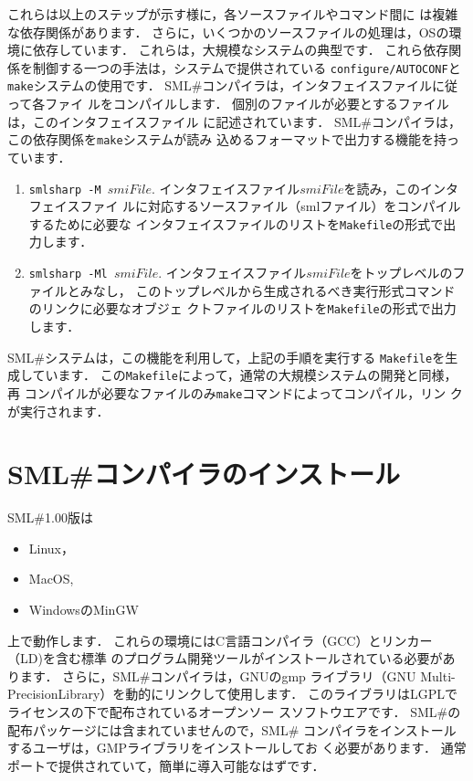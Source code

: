 \documentclass{jbook}
\newcommand{\smlsharp}{SML\#}
\newcommand{\version}{1.00}
\begin{document}
	これらは以上のステップが示す様に，各ソースファイルやコマンド間に
は複雑な依存関係があります．
	さらに，いくつかのソースファイルの処理は，OSの環境に依存しています．
	これらは，大規模なシステムの典型です．
	これら依存関係を制御する一つの手法は，システムで提供されている
{\tt configure/AUTOCONF}と{\tt make}システムの使用です．
	\smlsharp{}コンパイラは，インタフェイスファイルに従って各ファイ
ルをコンパイルします．
	個別のファイルが必要とするファイルは，このインタフェイスファイル
に記述されています．
	\smlsharp{}コンパイラは，この依存関係を{\tt make}システムが読み
込めるフォーマットで出力する機能を持っています．
\begin{enumerate}
\item {\tt smlsharp -M $smiFile$}.
	インタフェイスファイル$smiFile$を読み，このインタフェイスファイ
ルに対応するソースファイル（smlファイル）をコンパイルするために必要な
インタフェイスファイルのリストを{\tt Makefile}の形式で出力します．
\item {\tt smlsharp -Ml $smiFile$}.
	インタフェイスファイル$smiFile$をトップレベルのファイルとみなし，
このトップレベルから生成されるべき実行形式コマンドのリンクに必要なオブジェ
クトファイルのリストを{\tt Makefile}の形式で出力します．
\end{enumerate}	
	\smlsharp{}システムは，この機能を利用して，上記の手順を実行する
{\tt Makefile}を生成しています．
	この{\tt Makefile}によって，通常の大規模システムの開発と同様，再
コンパイルが必要なファイルのみ{\tt make}コマンドによってコンパイル，リン
クが実行されます．

\section{\smlsharp{}コンパイラのインストール}

	\smlsharp{}\version{}版は
\begin{itemize}
\item Linux，
\item MacOS,
\item WindowsのMinGW
\end{itemize}
上で動作します．
	これらの環境にはC言語コンパイラ（GCC）とリンカー（LD)を含む標準
のプログラム開発ツールがインストールされている必要があります．
	さらに，\smlsharp{}コンパイラは，GNUのgmp
ライブラリ（GNU Multi-PrecisionLibrary）を動的にリンクして使用します．
	このライブラリはLGPLでライセンスの下で配布されているオープンソー
スソフトウエアです．
	\smlsharp{}の配布パッケージには含まれていませんので，\smlsharp{}
コンパイラをインストールするユーザは，GMPライブラリをインストールしてお
く必要があります．
	通常ポートで提供されていて，簡単に導入可能なはずです．
\end{document}
